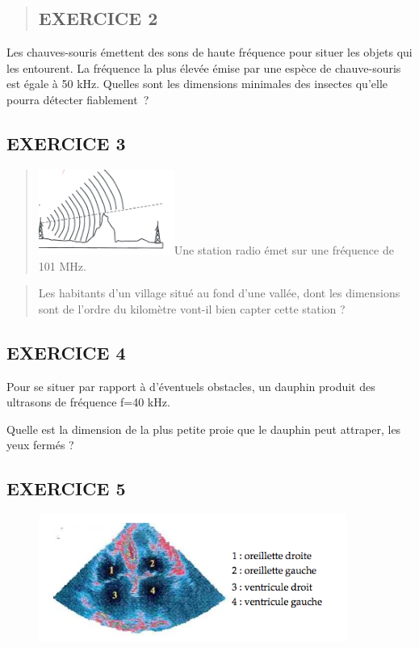 {\begin{quote}\subsection{EXERCICE 2}
\end{quote}

Les chauves-souris émettent des sons de haute fréquence pour situer les
objets qui les entourent. La fréquence la plus élevée émise par une
espèce de chauve-souris est égale à 50 kHz. Quelles sont les dimensions
minimales des insectes qu'elle pourra détecter fiablement~?
\subsection{EXERCICE 3}

\begin{quote}
\includegraphics[width=4.445cm,height=2.787cm]{Pictures/10000001000002E4000001CE9CDB74834F100431.png}Une
station radio émet sur une fréquence de 101 MHz.
\end{quote}

\begin{quote}
Les habitants d'un village situé au fond d'une vallée, dont les
dimensions sont de l'ordre du kilomètre vont-il bien capter cette
station ?
\end{quote}
\subsection{EXERCICE 4}

Pour se situer par rapport à d'éventuels obstacles, un dauphin produit
des ultrasons de fréquence f=40 kHz.

Quelle est la dimension de la plus petite proie que le dauphin peut
attraper, les yeux fermés ?
\subsection{EXERCICE 5 }

\begin{figure}
\centering
\includegraphics[width=10.084cm,height=4.142cm]{Pictures/10000001000001D1000000BF0020819CCFE94127.png}
\caption{}
\end{figure}

}
